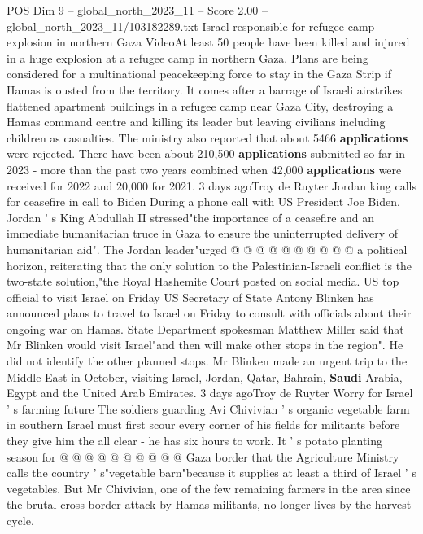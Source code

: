 \begin{textsample}{POS Dim 9 – global\_north\_2023\_11 – Score 2.00 – global\_north\_2023\_11/103182289.txt}  \label{ex:f9_pos_377}
Israel responsible for refugee camp explosion in northern Gaza VideoAt least 50 people have been killed and injured in a huge explosion at a refugee camp in northern Gaza.
Plans are being considered for a multinational peacekeeping force to stay in the Gaza Strip if Hamas is ousted from the territory.
It comes after a barrage of Israeli airstrikes flattened apartment buildings in a refugee camp near Gaza City, destroying a Hamas command centre and killing its leader but leaving civilians including children as casualties.
The ministry also reported that about 5466 \textbf{applications} were rejected.
There have been about 210,500 \textbf{applications} submitted so far in 2023 - more than the past two years combined when 42,000 \textbf{applications} were received for 2022 and 20,000 for 2021. 3 days agoTroy de Ruyter Jordan king calls for ceasefire in call to Biden During a phone call with US President Joe Biden, Jordan ' s King Abdullah II stressed"the importance of a ceasefire and an immediate humanitarian truce in Gaza to ensure the uninterrupted delivery of humanitarian aid".
The Jordan leader"urged @ @ @ @ @ @ @ @ @ @ a political horizon, reiterating that the only solution to the Palestinian-Israeli conflict is the two-state solution,"the Royal Hashemite Court posted on social media.
US top official to visit Israel on Friday US Secretary of State Antony Blinken has announced plans to travel to Israel on Friday to consult with officials about their ongoing war on Hamas.
State Department spokesman Matthew Miller said that Mr Blinken would visit Israel"and then will make other stops in the region".
He did not identify the other planned stops.
Mr Blinken made an urgent trip to the Middle East in October, visiting Israel, Jordan, Qatar, Bahrain, \textbf{Saudi} Arabia, Egypt and the United Arab Emirates. 3 days agoTroy de Ruyter Worry for Israel ' s farming future The soldiers guarding Avi Chivivian ' s organic vegetable farm in southern Israel must first scour every corner of his fields for militants before they give him the all clear - he has six hours to work.
It ' s potato planting season for @ @ @ @ @ @ @ @ @ @ Gaza border that the Agriculture Ministry calls the country ' s"vegetable barn"because it supplies at least a third of Israel ' s vegetables.
But Mr Chivivian, one of the few remaining farmers in the area since the brutal cross-border attack by Hamas militants, no longer lives by the harvest cycle.

\end{textsample}
